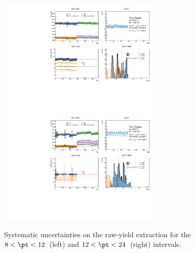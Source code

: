 \begin{figure}
    \centering
    \includegraphics[width=0.7\textwidth]{Figures/Chapter 5/AllPtBins/RawYieldSyst8_12.pdf}
    \includegraphics[width=0.7\textwidth]{Figures/Chapter 5/AllPtBins/RawYieldSyst12_24.pdf}
    \caption{Systematic uncertainties on the raw-yield extraction for the $8 < \pt < 12$~\gevc (left) and $12 < \pt < 24$~\gevc (right) intervals.}
\end{figure}
